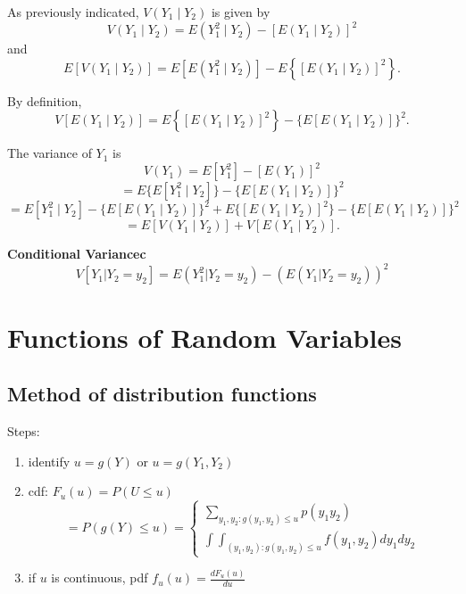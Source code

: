 \documentclass{report}
\begin{document}
\begin{myproof}
As previously indicated, \( V(Y_1 \mid Y_2) \) is given by
\[
V(Y_1 \mid Y_2) = E(Y_1^2 \mid Y_2) - [E(Y_1 \mid Y_2)]^2
\]
and
\[
E[V(Y_1 \mid Y_2)] = E[E(Y_1^2 \mid Y_2)] - E\left\{[E(Y_1 \mid Y_2)]^2\right\}.
\]

By definition,
\[
V[E(Y_1 \mid Y_2)] = E\left\{[E(Y_1 \mid Y_2)]^2\right\} - \{E[E(Y_1 \mid Y_2)]\}^2.
\]

The variance of \( Y_1 \) is
\[
V(Y_1) = E[Y_1^2] - [E(Y_1)]^2
\]
\[
= E\{E[Y_1^2 \mid Y_2]\} - \{E[E(Y_1 \mid Y_2)]\}^2
\]
\[
= E[Y_1^2 \mid Y_2] - \{E[E(Y_1 \mid Y_2)]\}^2 + E\{[E(Y_1 \mid Y_2)]^2\} - \{E[E(Y_1 \mid Y_2)]\}^2
\]
\[
= E[V(Y_1 \mid Y_2)] + V[E(Y_1 \mid Y_2)].
\]
\end{myproof}
\textbf{Conditional Variancec} $$V[Y_1 | Y_2 = y_2] = E(Y_1^2 | Y_2=y_2) - (E(Y_1|Y_2 = y_2))^2$$
\chapter{Functions of Random Variables}
\section{Method of distribution functions}
Steps: 
\begin{enumerate}
	\item identify $u = g(Y)$ or $u = g(Y_1,Y_2)$
	\item cdf: $F_u(u) = P(U\leq u)$ 
\[ 
 = P(g(Y) \leq u) =
\begin{cases}
	\sum_{y_1,y_2: g(y_1,y_2) \leq u} p(y_1y_2)  \\
	\int\int_{(y_1,y_2):g(y_1,y_2) \leq u}f(y_1,y_2)dy_1dy_2
\end{cases}
\]
	\item if $u$ is continuous, pdf $f_u(u) = \frac{dF_u(u)}{du}$
\end{enumerate}
\end{document}
